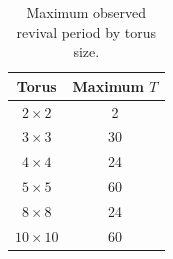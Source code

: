 \begin{table}[htbp]
  \centering
  \caption{Maximum observed revival period by torus size.}
  \label{tab:results-2}
  \begin{tabular}{cc}
    \toprule
    Torus & Maximum $T$ \\
    \midrule
    $2 \times 2$   & 2  \\
    $3 \times 3$   & 30 \\
    $4 \times 4$   & 24 \\
    $5 \times 5$   & 60 \\
    $8 \times 8$   & 24 \\
    $10 \times 10$ & 60 \\
    \bottomrule
  \end{tabular}
\end{table}
